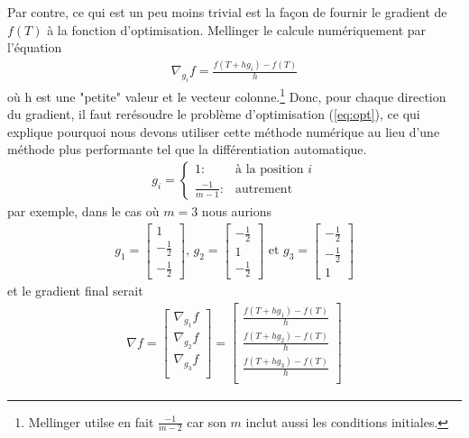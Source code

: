 Par contre, ce qui est un peu moins trivial est la façon de fournir le gradient de $f(T)$ à la fonction d'optimisation. Mellinger le calcule numériquement par l'équation
\begin{align}
	\nabla_{g_i}f = \frac{f(T + hg_i) - f(T)}{h}
\end{align}
où h est une "petite" valeur et le vecteur colonne.\footnote{Mellinger utilse en fait $\frac{-1}{m-2}$ car son $m$ inclut aussi les conditions initiales.} Donc, pour chaque direction du gradient, il faut rerésoudre le problème d'optimisation (\ref{eq:opt}), ce qui explique pourquoi nous devons utiliser cette méthode numérique au lieu d'une méthode plus performante tel que la différentiation automatique.
\begin{align}
g_i = \left\{
  \begin{array}{ll}
    1: & \text{à la position }i  \\
    \frac{-1}{m-1} : & \text{autrement}
  \end{array}
\right.
\end{align}
par exemple, dans le cas où $m=3$ nous aurions
\begin{align*}
	g_1 = \begin{bmatrix} 1\\ -\frac{1}{2} \\-\frac{1}{2} 	\end{bmatrix}\text{, }
	g_2 = \begin{bmatrix} -\frac{1}{2}\\ 1 \\-\frac{1}{2} 	\end{bmatrix}\text{ et }
	g_3 = \begin{bmatrix} -\frac{1}{2} \\-\frac{1}{2}\\ 1 	\end{bmatrix}
\end{align*}
et le gradient final serait
\begin{align*}
\nabla f = \begin{bmatrix}
	\nabla_{g_1}f\\
	\nabla_{g_2}f\\
	\nabla_{g_3}f\\
\end{bmatrix} = \begin{bmatrix}
	 \frac{f(T + hg_1) - f(T)}{h}\\
	 \frac{f(T + hg_2) - f(T)}{h}\\
	 \frac{f(T + hg_3) - f(T)}{h}\\
\end{bmatrix}
\end{align*}
